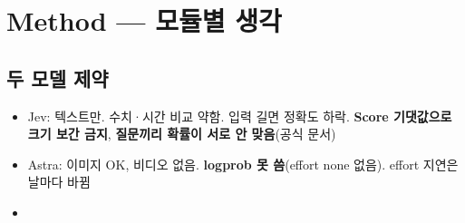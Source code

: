 \section{Method --- 모듈별 생각}
\label{sec:method}

\subsection{두 모델 제약}
\begin{itemize}
  \item Jev: 텍스트만. 수치·시간 비교 약함. 입력 길면 정확도 하락. \textbf{Score 기댓값으로 크기 보간 금지}, \textbf{질문끼리 확률이 서로 안 맞음}(공식 문서)
  \item Astra: 이미지 OK, 비디오 없음. \textbf{logprob 못 씀}(effort none 없음). effort 지연은 날마다 바뀜
  \item {}
\end{itemize}

